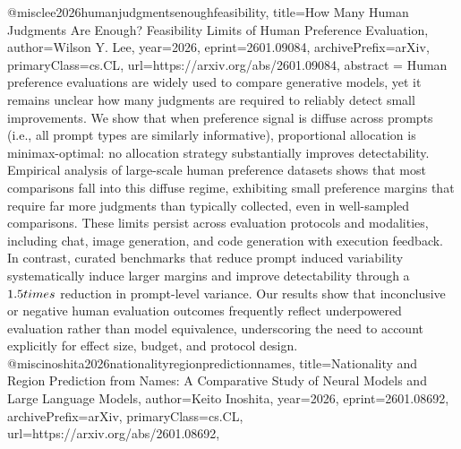 {}@misc{lee2026humanjudgmentsenoughfeasibility,
      title={How Many Human Judgments Are Enough? Feasibility Limits of Human Preference Evaluation}, 
      author={Wilson Y. Lee},
      year={2026},
      eprint={2601.09084},
      archivePrefix={arXiv},
      primaryClass={cs.CL},
      url={https://arxiv.org/abs/2601.09084},
      abstract = {Human preference evaluations are widely used to compare generative models, yet it remains unclear how many judgments are required to reliably detect small improvements. We show that when preference signal is diffuse across prompts (i.e., all prompt types are similarly informative), proportional allocation is minimax-optimal: no allocation strategy substantially improves detectability. Empirical analysis of large-scale human preference datasets shows that most comparisons fall into this diffuse regime, exhibiting small preference margins that require far more judgments than typically collected, even in well-sampled comparisons. These limits persist across evaluation protocols and modalities, including chat, image generation, and code generation with execution feedback. In contrast, curated benchmarks that reduce prompt induced variability systematically induce larger margins and improve detectability through a $1.5\\times$ reduction in prompt-level variance. Our results show that inconclusive or negative human evaluation outcomes frequently reflect underpowered evaluation rather than model equivalence, underscoring the need to account explicitly for effect size, budget, and protocol design.}
}@misc{inoshita2026nationalityregionpredictionnames,
      title={Nationality and Region Prediction from Names: A Comparative Study of Neural Models and Large Language Models}, 
      author={Keito Inoshita},
      year={2026},
      eprint={2601.08692},
      archivePrefix={arXiv},
      primaryClass={cs.CL},
      url={https://arxiv.org/abs/2601.08692},
}
